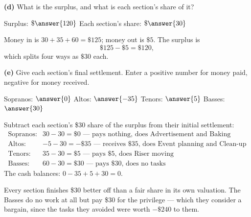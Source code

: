 \documentclass[12pt]{ximera}
\begin{document}
\begin{problem}
\begin{prompt}
\textbf{(d)} What is the surplus, and what is each section's share of it?

Surplus: $\$\answer{120}$ \qquad Each section's share: $\$\answer{30}$

\begin{feedback}
Money in is $30+35+60 = \$125$; money out is $\$5$. The surplus is
\[ \$125 - \$5 = \$120, \]
which splits four ways as $\$30$ each.
\end{feedback}
\end{prompt}

\begin{prompt}
\textbf{(e)} Give each section's final settlement. Enter a positive number for money
paid, negative for money received.

Sopranos: $\answer{0}$ \quad Altos: $\answer{-35}$ \quad Tenors: $\answer{5}$ \quad
Basses: $\answer{30}$

\begin{feedback}
Subtract each section's \$30 share of the surplus from their initial settlement:
\[
\begin{array}{ll}
\text{Sopranos}: & 30 - 30 = \$0 \text{ --- pays nothing, does Advertisement and Baking}\\
\text{Altos}: & -5 - 30 = -\$35 \text{ --- receives \$35, does Event planning and Clean-up}\\
\text{Tenors}: & 35 - 30 = \$5 \text{ --- pays \$5, does Riser moving}\\
\text{Basses}: & 60 - 30 = \$30 \text{ --- pays \$30, does no tasks}
\end{array}
\]
The cash balances: $0 - 35 + 5 + 30 = 0$. \checkmark

Every section finishes \$30 better off than a fair share in its own valuation. The
Basses do no work at all but pay \$30 for the privilege --- which they consider a
bargain, since the tasks they avoided were worth $-\$240$ to them.
\end{feedback}
\end{prompt}
\end{problem}
\end{document}
